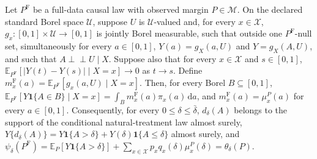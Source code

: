 Let \(P^{\mathrm F}\) be a full-data causal law with observed margin \(P\in\mathcal M\). On the declared standard Borel space \(\mathcal U\), suppose \(U\) is \(\mathcal U\)-valued and, for every \(x\in\mathcal X\), \(g_x:[0,1]\times\mathcal U\to[0,1]\) is jointly Borel measurable, such that outside one \(P^{\mathrm F}\)-null set, simultaneously for every \(a\in[0,1]\), \(Y(a)=g_X(a,U)\) and \(Y=g_X(A,U)\), and such that \(A\perp\!\!\!\perp U\mid X\). Suppose also that for every \(x\in\mathcal X\) and \(s\in[0,1]\), \(\mathbb E_{P^{\mathrm F}}[|Y(t)-Y(s)|\mid X=x]\to0\) as \(t\to s\). Define \(m_x^{\mathrm F}(a)=\mathbb E_{P^{\mathrm F}}[g_x(a,U)\mid X=x]\). Then, for every Borel \(B\subseteq[0,1]\), \(\mathbb E_{P^{\mathrm F}}[Y\mathbf 1\{A\in B\}\mid X=x]=\int_Bm_x^{\mathrm F}(a)\pi_x(a)\,\mathrm da\), and \(m_x^{\mathrm F}(a)=\mu_x^P(a)\) for every \(a\in[0,1]\). Consequently, for every \(0\leq\delta\leq\bar\delta\), \(d_\delta(A)\) belongs to the support of the conditional natural-treatment law almost surely, \(Y\{d_\delta(A)\}=Y\mathbf 1\{A>\delta\}+Y(\delta)\mathbf 1\{A\leq\delta\}\) almost surely, and \(\psi_\delta(P^{\mathrm F})=\mathbb E_P[Y\mathbf 1\{A>\delta\}]+\sum_{x\in\mathcal X}p_xq_x(\delta)\mu_x^P(\delta)=\theta_\delta(P)\).